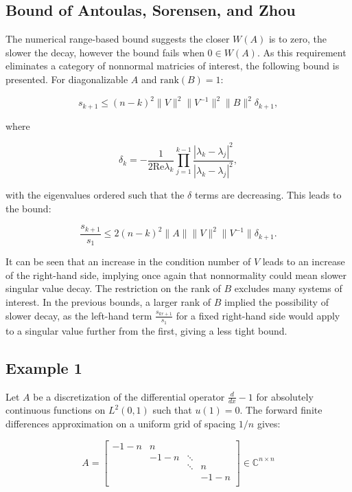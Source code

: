 \documentclass[12pt]{scrartcl}
\newcommand{\Cnn}{\mathbb{C}^{n \times n}}
\begin{document}
\subsection{Bound of Antoulas, Sorensen, and Zhou}

The numerical range-based bound suggests the closer $W(A)$ is to zero, the slower the decay, however the bound fails when $0 \in W(A)$. As this requirement eliminates a category of nonnormal matricies of interest, the following bound is presented. For diagonalizable $A$ and $\text{rank}(B)=1$:

$$s_{k+1} \leq (n-k)^{2} \|V\|^{2} \|V^{-1}\|^{2}\|B\|^{2} \delta_{k+1},$$

where 

$$\delta_{k} = - \frac{1}{2 \text{Re} \lambda_{k}} \prod_{j=1}^{k-1} \frac{|\lambda_{k} - \lambda_{j}|^{2}}{|\lambda_{k}-\lambda_{j}|^{2}},$$

with the eigenvalues ordered such that the $\delta$ terms are decreasing. This leads to the bound:

$$\frac{s_{k+1}}{s_{1}} \leq 2(n-k)^{2} \|A\| \|V\|^{2} \|V^{-1}\| \delta_{k+1}.$$


It can be seen that an increase in the condition number of $V$ leads to an increase of the right-hand side, implying once again that nonnormality could mean slower singular value decay. The restriction on the rank of $B$ excludes many systems of interest. In the previous bounds, a larger rank of $B$ implied the possibility of slower decay, as the left-hand term $\frac{s_{kr+1}}{s_{1}}$ for a fixed right-hand side would apply to a singular value further from the first, giving a less tight bound. 


\subsection{Example 1}

Let $A$ be a discretization of the differential operator $\frac{d}{dx} -1$ for absolutely continuous functions on $L^{2}(0,1)$ such that $u(1)=0$. The forward finite differences approximation on a uniform grid of spacing $1/n$ gives:

\[
A =
 \begin{bmatrix}
  -1-n & n & & \\
  & -1-n & \ddots &  \\
  & & \ddots & n \\
  & & & -1-n \\
 \end{bmatrix} \in \Cnn
\] 
\end{document}
